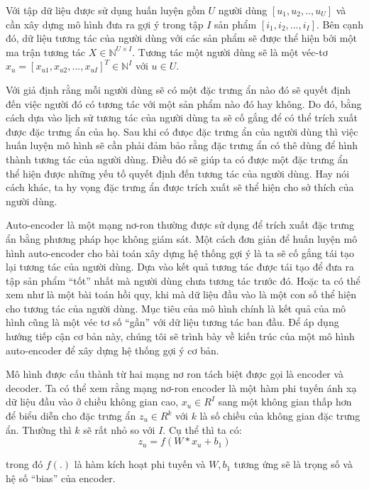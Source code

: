     Với tập dữ liệu được sử dụng huấn luyện gồm $U$ người dùng $[u_1,u_2, .., u_U]$ và cần xây dựng mô hình đưa ra gợi ý trong tập $I$ sản phẩm $[i_1,i_2, ..., i_I]$. Bên cạnh đó, dữ liệu tương tác của người dùng với các sản phẩm sẽ được thể hiện bởi một ma trận tương tác $X \in \mathbb{N}^{U\times I}$. Tương tác một người dùng sẽ là một véc-tơ $x_u = [x_{u1}, x_{u2}, ..., x_{uI}]^T \in \mathbb{N}^I $ với $u \in U$.
    
    Với giả định rằng mỗi người dùng sẽ có một đặc trưng ẩn nào đó sẽ quyết định đến việc người đó có tương tác với một sản phẩm nào đó hay không.
    Do đó, bằng cách dựa vào lịch sử tương tác của người dùng ta sẽ cố gắng để có thể trích xuất được đặc trưng ẩn của họ.
    Sau khi có đưọc đặc trưng ẩn của người dùng thì việc huấn luyện mô hình sẽ cần phải đảm bảo rằng đặc trưng ẩn có thê dùng để hình thành tương tác của người dùng. 
    Điều đó sẽ giúp ta có được một đặc trưng ẩn thể hiện được những yếu tố quyết định đến tương tác của người dùng.
    Hay nói cách khác, ta hy vọng đặc trưng ẩn được trích xuất sẽ thể hiện cho sở thích của người dùng. 

    Auto-encoder là một mạng nơ-ron thường được sử dụng để trích xuất đặc trưng ẩn bằng phương pháp học không giám sát.
    Một cách đơn giản để huấn luyện mô hình auto-encoder cho bài toán xây dựng hệ thống gợi ý là ta sẽ cố gắng tái tạo lại tương tác của người dùng.
    Dựa vào kết quả tương tác được tái tạo để đưa ra tập sản phẩm ``tốt'' nhất mà người dùng chưa tương tác trước đó. 
    Hoặc ta có thể xem như là một bài toán hồi quy, khi mà dữ liệu đầu vào là một con số thể hiện cho tương tác của người dùng.
    Mục tiêu của mô hình chính là kết quả của mô hình cũng là một véc tơ số ``gần'' với dữ liệu tương tác ban đầu.  
    Để áp dụng hướng tiếp cận cơ bản này, chúng tôi sẽ trình bày về kiến trúc của một mô hình auto-encoder để xây dựng hệ thống gợi ý cơ bản.

    Mô hình được cấu thành từ hai mạng nơ ron tách biệt được gọi là encoder và decoder. 
    Ta có thể xem rằng mạng nơ-ron encoder là một hàm phi tuyến ánh xạ dữ liệu đầu vào ở chiều không gian cao, $x_u \in R^I$ sang một không gian thấp hơn để biểu diễn cho đặc trưng ẩn $z_u \in R^k$ với $k$ là số chiều của không gian đặc trưng ẩn. 
    Thường thì $k$ sẽ rất nhỏ so với $I$. Cụ thể thì ta có:
    \begin{equation}
        z_u = f(W * x_u + b_1)
    \end{equation}

  
    trong đó $f(.)$ là hàm kích hoạt phi tuyến và $W,b_1$ tương ứng sẽ là trọng số và hệ số ``bias'' của encoder. 

